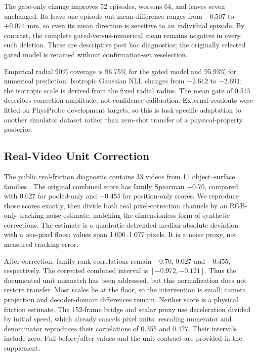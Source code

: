 \documentclass{ieeeaccess}
\begin{document}
The gate-only change improves 52 episodes, worsens 64, and leaves seven unchanged. Its leave-one-episode-out mean difference ranges from $-0.507$ to $+0.074$ mm, so even its mean direction is sensitive to an individual episode. By contrast, the complete gated-versus-numerical mean remains negative in every such deletion. These are descriptive post hoc diagnostics; the originally selected gated model is retained without confirmation-set reselection.

Empirical radial 90\% coverage is 96.75\% for the gated model and 95.93\% for numerical prediction. Isotropic Gaussian NLL changes from $-2.612$ to $-2.691$; the isotropic scale is derived from the fixed radial radius. The mean gate of 0.545 describes correction amplitude, not confidence calibration. External readouts were fitted on PhysProbe development targets, so this is task-specific adaptation to another simulator dataset rather than zero-shot transfer of a physical-property posterior.

\subsection{Real-Video Unit Correction}
The public real-friction diagnostic contains 33 videos from 11 object--surface families \cite{zhan2026idpp}. The original combined score has family Spearman $-0.70$, compared with 0.027 for pooled-only and $-0.455$ for position-only scores. We reproduce those scores exactly, then divide both real pixel-correction channels by an RGB-only tracking-noise estimate, matching the dimensionless form of synthetic corrections. The estimate is a quadratic-detrended median absolute deviation with a one-pixel floor; values span 1.000--1.077 pixels. It is a noise proxy, not measured tracking error.

After correction, family rank correlations remain $-0.70$, 0.027 and $-0.455$, respectively. The corrected combined interval is $[-0.972,-0.121]$. Thus the documented unit mismatch has been addressed, but this normalization does not restore transfer. Most scales lie at the floor, so the intervention is small; camera projection and decoder-domain differences remain. Neither score is a physical friction estimate. The 152-frame bridge and scalar proxy use deceleration divided by initial speed, which already cancels pixel units: rescaling numerator and denominator reproduces their correlations of 0.355 and 0.427. Their intervals include zero. Full before/after values and the unit contract are provided in the supplement.
\end{document}

